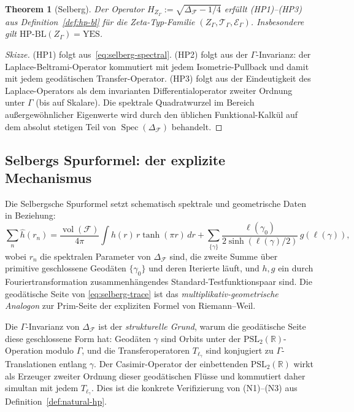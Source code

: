 \documentclass[11pt]{article}
\newtheorem{theorem}{Theorem}[section]
\theoremstyle{definition}
\theoremstyle{remark}
\newcommand{\HBL}{\mathrm{HP\text{-}BL}}
\newcommand{\PSL}{\mathrm{PSL}}
\newcommand{\Spec}{\operatorname{Spec}}
\begin{document}
\begin{theorem}[Selberg]\label{thm:selberg-hp}
Der Operator $H_{Z_\Gamma} := \sqrt{\Delta_\mathcal{F} - 1/4}$
erfüllt (HP1)--(HP3) aus Definition~\ref{def:hp-bl} für die Zeta-Typ-Familie
$(Z_\Gamma, \mathcal{T}_\Gamma, \mathcal{E}_\Gamma)$.
Insbesondere gilt $\HBL(Z_\Gamma) = \mathrm{YES}$.
\end{theorem}

\begin{proof}[Skizze]
(HP1) folgt aus~\eqref{eq:selberg-spectral}. (HP2) folgt aus
der $\Gamma$-Invarianz: der Laplace-Beltrami-Operator kommutiert mit jedem
Isometrie-Pullback und damit mit jedem geodätischen Transfer-Operator.
(HP3) folgt aus der Eindeutigkeit des Laplace-Operators als dem
invarianten Differentialoperator zweiter Ordnung unter $\Gamma$ (bis auf Skalare).
Die spektrale Quadratwurzel im Bereich außergewöhnlicher Eigenwerte wird durch den
üblichen Funktional-Kalkül auf dem absolut stetigen Teil von
$\Spec(\Delta_\mathcal{F})$ behandelt.
\end{proof}

\subsection{Selbergs Spurformel: der explizite Mechanismus}
\label{sec:selberg-trace}

Die Selbergsche Spurformel \cite{Selberg1956} setzt schematisch spektrale und geometrische
Daten in Beziehung:
\begin{equation}
\label{eq:selberg-trace}
  \sum_n \widehat{h}(r_n)
  = \frac{\operatorname{vol}(\mathcal{F})}{4\pi} \int h(r)\,r\tanh(\pi r)\,dr
  + \sum_{\{\gamma\}} \frac{\ell(\gamma_0)}{2\sinh(\ell(\gamma)/2)}\,
      g(\ell(\gamma)),
\end{equation}
wobei $r_n$ die spektralen Parameter von $\Delta_\mathcal{F}$ sind, die
zweite Summe über primitive geschlossene Geodäten $\{\gamma_0\}$ und deren
Iterierte läuft, und $h, g$ ein durch Fouriertransformation zusammenhängendes
Standard-Testfunktionspaar sind. Die geodätische Seite von \eqref{eq:selberg-trace}
ist das \emph{multiplikativ-geometrische Analogon} zur Prim-Seite der expliziten Formel
von Riemann--Weil.

Die $\Gamma$-Invarianz von $\Delta_\mathcal{F}$ ist der
\emph{strukturelle Grund}, warum die geodätische Seite diese geschlossene Form hat:
Geodäten $\gamma$ sind Orbits unter der $\PSL_2(\mathbb{R})$-Operation
modulo $\Gamma$, und die Transferoperatoren $T_{\ell_\gamma}$ sind
konjugiert zu $\Gamma$-Translationen entlang $\gamma$. Der Casimir-Operator
der einbettenden $\PSL_2(\mathbb{R})$ wirkt als Erzeuger zweiter Ordnung dieser geodätischen
Flüsse und kommutiert daher simultan mit jedem $T_{\ell_\gamma}$. Dies ist
die konkrete Verifizierung von (N1)--(N3) aus Definition~\ref{def:natural-hp}.
\end{document}
